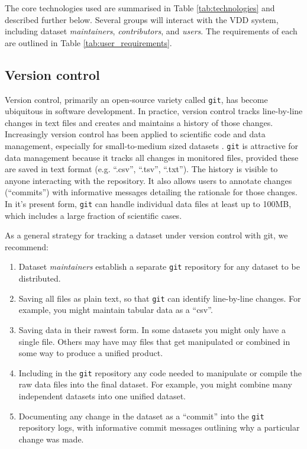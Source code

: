 \documentclass[a4paper,num-refs]{assets/oup-contemporary}
\begin{document}
The core technologies used are summarised in Table \ref{tab:technologies} and described further below. Several groups will interact with the VDD system, including dataset \emph{maintainers}, \emph{contributors}, and \emph{users}. The requirements of each are outlined in Table \ref{tab:user_requirements}.

\subsection{Version control}

Version control, primarily an open-source variety called \texttt{git}, has become ubiquitous in software development. In practice, version control tracks line-by-line changes in text files and creates and maintains a history of those changes. Increasingly version control has been applied to scientific code and data management, especially for small-to-medium sized datasets \cite{Ram-2013, Perkel-2016, Lowndes-2017}. \texttt{git} is attractive for data management because it tracks all changes in monitored files, provided these are saved in text format (e.g. ``.csv'', ``.tsv'', ``.txt''). The history is visible to anyone interacting with the repository. It also allows users to annotate changes (``commits'') with informative messages detailing the rationale for those changes. In it's present form, \texttt{git} can handle individual data files at least up to 100MB, which includes a large fraction of scientific cases.

As a general strategy for tracking a dataset under version control with git, we recommend:
\begin{enumerate}
  \item Dataset \emph{maintainers} establish a separate \texttt{git} repository for any dataset to be distributed.
  \item Saving all files as plain text, so that \texttt{git} can identify line-by-line changes. For example, you might maintain tabular data as a ``csv''.
  \item Saving data in their rawest form. In some datasets you might only have a single file. Others may have may files that get manipulated or combined in some way to produce a unified product.
  \item Including in the \texttt{git} repository any code needed to manipulate or compile the raw data files into the final dataset. For example, you might combine many independent datasets into one unified dataset.
  \item Documenting any change in the dataset as a ``commit'' into the \texttt{git} repository logs, with informative commit messages outlining why a particular change was made.
\end{enumerate}
\end{document}
